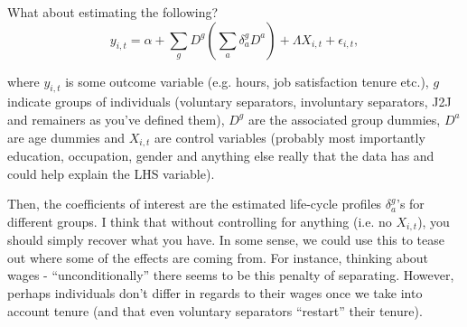 \documentclass[12pt,a4paper]{article}
\begin{document}
	
What about estimating the following?
\begin{equation}
y_{i,t} = \alpha + \sum_g D^g \left( \sum_{a} \delta_a^g D^a\right) + \Lambda X_{i,t} + \epsilon_{i,t},
\end{equation} 	

\noindent where $y_{i,t}$ is some outcome variable (e.g. hours, job satisfaction tenure etc.), $g$ indicate groups of individuals (voluntary separators, involuntary separators, J2J and remainers as you've defined them), $D^g$ are the associated group dummies, $D^a$ are age dummies and $X_{i,t}$ are control variables (probably most importantly education, occupation, gender and anything else really that the data has and could help explain the LHS variable). 

Then, the coefficients of interest are the estimated life-cycle profiles $\delta_a^g$'s for different groups. I think that without controlling for anything (i.e. no $X_{i,t}$), you should simply recover what you have. In some sense, we could use this to tease out where some of the effects are coming from. For instance, thinking about wages - ``unconditionally'' there seems to be this penalty of separating. However, perhaps individuals don't differ in regards to their wages once we take into account tenure (and that even voluntary separators ``restart'' their tenure). 
\end{document}
